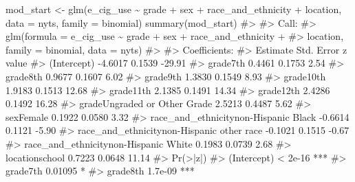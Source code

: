 \documentclass[
  letterpaper,
]{latex/krantz}
\makeatletter
\newenvironment{Shaded}{\begin{snugshade}}{\end{snugshade}}
\newcommand{\AttributeTok}[1]{\textcolor[rgb]{0.40,0.45,0.13}{#1}}
\newcommand{\CommentTok}[1]{\textcolor[rgb]{0.37,0.37,0.37}{#1}}
\newcommand{\FunctionTok}[1]{\textcolor[rgb]{0.28,0.35,0.67}{#1}}
\newcommand{\NormalTok}[1]{\textcolor[rgb]{0.00,0.23,0.31}{#1}}
\newcommand{\OtherTok}[1]{\textcolor[rgb]{0.00,0.23,0.31}{#1}}
\newcommand{\SpecialCharTok}[1]{\textcolor[rgb]{0.37,0.37,0.37}{#1}}
\newenvironment{kframe}{%
\medskip{}
\setlength{\fboxsep}{.8em}
 \def\at@end@of@kframe{}%
 \ifinner\ifhmode%
  \def\at@end@of@kframe{\end{minipage}}%
  \begin{minipage}{\columnwidth}%
 \fi\fi%
 \def\FrameCommand##1{\hskip\@totalleftmargin \hskip-\fboxsep
 \colorbox{shadecolor}{##1}\hskip-\fboxsep
     \hskip-\linewidth \hskip-\@totalleftmargin \hskip\columnwidth}%
 \MakeFramed {\advance\hsize-\width
   \@totalleftmargin\z@ \linewidth\hsize
   \@setminipage}}%
 {\par\unskip\endMakeFramed%
 \at@end@of@kframe}
\renewenvironment{Shaded}{\begin{kframe}}{\end{kframe}}
\makeatother
\begin{document}
\begin{Shaded}
\begin{Highlighting}[]
\NormalTok{mod\_start }\OtherTok{\textless{}{-}} \FunctionTok{glm}\NormalTok{(e\_cig\_use }\SpecialCharTok{\textasciitilde{}}\NormalTok{ grade }\SpecialCharTok{+}\NormalTok{ sex }\SpecialCharTok{+}\NormalTok{ race\_and\_ethnicity }\SpecialCharTok{+} 
\NormalTok{                   location, }\AttributeTok{data =}\NormalTok{ nyts, }\AttributeTok{family =}\NormalTok{ binomial)}
\FunctionTok{summary}\NormalTok{(mod\_start)}
\CommentTok{\#\textgreater{} }
\CommentTok{\#\textgreater{} Call:}
\CommentTok{\#\textgreater{} glm(formula = e\_cig\_use \textasciitilde{} grade + sex + race\_and\_ethnicity + }
\CommentTok{\#\textgreater{}     location, family = binomial, data = nyts)}
\CommentTok{\#\textgreater{} }
\CommentTok{\#\textgreater{} Coefficients:}
\CommentTok{\#\textgreater{}                                           Estimate Std. Error z value}
\CommentTok{\#\textgreater{} (Intercept)                                {-}4.6017     0.1539  {-}29.91}
\CommentTok{\#\textgreater{} grade7th                                    0.4461     0.1753    2.54}
\CommentTok{\#\textgreater{} grade8th                                    0.9677     0.1607    6.02}
\CommentTok{\#\textgreater{} grade9th                                    1.3830     0.1549    8.93}
\CommentTok{\#\textgreater{} grade10th                                   1.9183     0.1513   12.68}
\CommentTok{\#\textgreater{} grade11th                                   2.1385     0.1491   14.34}
\CommentTok{\#\textgreater{} grade12th                                   2.4286     0.1492   16.28}
\CommentTok{\#\textgreater{} gradeUngraded or Other Grade                2.5213     0.4487    5.62}
\CommentTok{\#\textgreater{} sexFemale                                   0.1922     0.0580    3.32}
\CommentTok{\#\textgreater{} race\_and\_ethnicitynon{-}Hispanic Black       {-}0.6614     0.1121   {-}5.90}
\CommentTok{\#\textgreater{} race\_and\_ethnicitynon{-}Hispanic other race  {-}0.1021     0.1515   {-}0.67}
\CommentTok{\#\textgreater{} race\_and\_ethnicitynon{-}Hispanic White        0.1983     0.0739    2.68}
\CommentTok{\#\textgreater{} locationschool                              0.7223     0.0648   11.14}
\CommentTok{\#\textgreater{}                                           Pr(\textgreater{}|z|)    }
\CommentTok{\#\textgreater{} (Intercept)                                \textless{} 2e{-}16 ***}
\CommentTok{\#\textgreater{} grade7th                                   0.01095 *  }
\CommentTok{\#\textgreater{} grade8th                                   1.7e{-}09 ***}

\end{Highlighting}
\end{Shaded}
\end{document}
